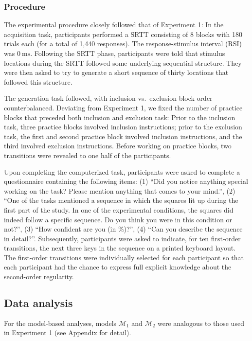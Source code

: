 \documentclass[floatsintext,man]{apa6}
\begin{document}
\subsubsection{Procedure}\label{procedure-1}

The experimental procedure closely followed that of Experiment 1: In the
acquisition task, participants performed a SRTT consisting of 8 blocks
with 180 trials each (for a total of 1,440 responses). The
response-stimulus interval (RSI) was \(0~\text{ms}\). Following the SRTT
phase, participants were told that stimulus locations during the SRTT
followed some underlying sequential structure. They were then asked to
try to generate a short sequence of thirty locations that followed this
structure.

The generation task followed, with inclusion vs.~exclusion block order
counterbalanced. Deviating from Experiment 1, we fixed the number of
practice blocks that preceded both inclusion and exclusion task: Prior
to the inclusion task, three practice blocks involved inclusion
instructions; prior to the exclusion task, the first and second practice
block involved inclusion instructions, and the third involved exclusion
instructions. Before working on practice blocks, two transitions were
revealed to one half of the participants.

Upon completing the computerized task, participants were asked to
complete a questionnaire containing the following items: (1)
\enquote{Did you notice anything special working on the task? Please
mention anything that comes to your mind.}, (2) \enquote{One of the
tasks mentioned a sequence in which the squares lit up during the first
part of the study. In one of the experimental conditions, the squares
did indeed follow a specific sequence. Do you think you were in this
condition or not?}, (3) \enquote{How confident are you (in \%)?}, (4)
\enquote{Can you describe the sequence in detail?}. Subsequently,
participants were asked to indicate, for ten first-order transitions,
the next three keys in the sequence on a printed keyboard layout. The
first-order transitions were individually selected for each participant
so that each participant had the chance to express full explicit
knowledge about the second-order regularity.

\subsection{Data analysis}\label{data-analysis-1}

For the model-based analyses, models \(\mathcal{M}_1\) and
\(\mathcal{M}_2\) were analogous to those used in Experiment 1 (see
Appendix for detail).
\end{document}
